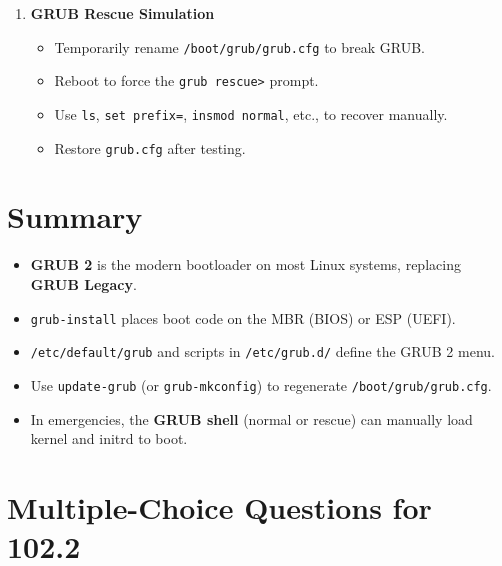 \documentclass[a4paper]{report}
\begin{document}
\begin{enumerate}
    \item \textbf{GRUB Rescue Simulation}
    \begin{itemize}
        \item Temporarily rename \texttt{/boot/grub/grub.cfg} to break GRUB.
        \item Reboot to force the \texttt{grub rescue>} prompt.
        \item Use \texttt{ls}, \texttt{set prefix=}, \texttt{insmod normal}, etc., to recover manually.
        \item Restore \texttt{grub.cfg} after testing.
    \end{itemize}
\end{enumerate}

\section*{Summary}

\begin{itemize}
    \item \textbf{GRUB 2} is the modern bootloader on most Linux systems, replacing \textbf{GRUB Legacy}.
    \item \texttt{grub-install} places boot code on the MBR (BIOS) or ESP (UEFI).
    \item \texttt{/etc/default/grub} and scripts in \texttt{/etc/grub.d/} define the GRUB 2 menu.
    \item Use \texttt{update-grub} (or \texttt{grub-mkconfig}) to regenerate \texttt{/boot/grub/grub.cfg}.
    \item In emergencies, the \textbf{GRUB shell} (normal or rescue) can manually load kernel and initrd to boot.
\end{itemize}




\newpage
\section*{Multiple-Choice Questions for 102.2}
\end{document}
